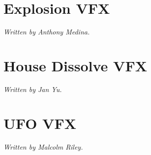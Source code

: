 \documentclass[sigconf]{acmart}
\begin{document}
\maketitle

\section{Explosion VFX}
\textit{Written by Anthony Medina.\quad}


\section{House Dissolve VFX}
\textit{Written by Jan Yu.\quad}


\section{UFO VFX}
\textit{Written by Malcolm Riley.\quad}


\end{document}
